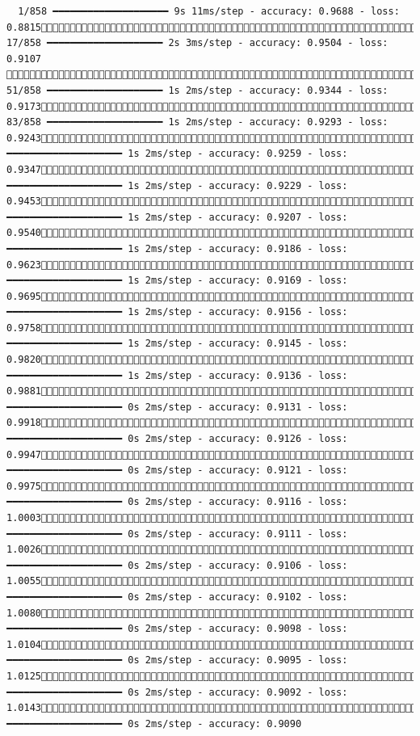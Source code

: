 \documentclass[
  letterpaper,
  DIV=11,
  numbers=noendperiod]{scrartcl}
\begin{document}
\begin{verbatim}
  1/858 ━━━━━━━━━━━━━━━━━━━━ 9s 11ms/step - accuracy: 0.9688 - loss: 0.8815 17/858 ━━━━━━━━━━━━━━━━━━━━ 2s 3ms/step - accuracy: 0.9504 - loss: 0.9107  51/858 ━━━━━━━━━━━━━━━━━━━━ 1s 2ms/step - accuracy: 0.9344 - loss: 0.9173 83/858 ━━━━━━━━━━━━━━━━━━━━ 1s 2ms/step - accuracy: 0.9293 - loss: 0.9243102/858 ━━━━━━━━━━━━━━━━━━━━ 1s 2ms/step - accuracy: 0.9259 - loss: 0.9347122/858 ━━━━━━━━━━━━━━━━━━━━ 1s 2ms/step - accuracy: 0.9229 - loss: 0.9453147/858 ━━━━━━━━━━━━━━━━━━━━ 1s 2ms/step - accuracy: 0.9207 - loss: 0.9540178/858 ━━━━━━━━━━━━━━━━━━━━ 1s 2ms/step - accuracy: 0.9186 - loss: 0.9623210/858 ━━━━━━━━━━━━━━━━━━━━ 1s 2ms/step - accuracy: 0.9169 - loss: 0.9695241/858 ━━━━━━━━━━━━━━━━━━━━ 1s 2ms/step - accuracy: 0.9156 - loss: 0.9758270/858 ━━━━━━━━━━━━━━━━━━━━ 1s 2ms/step - accuracy: 0.9145 - loss: 0.9820305/858 ━━━━━━━━━━━━━━━━━━━━ 1s 2ms/step - accuracy: 0.9136 - loss: 0.9881339/858 ━━━━━━━━━━━━━━━━━━━━ 0s 2ms/step - accuracy: 0.9131 - loss: 0.9918375/858 ━━━━━━━━━━━━━━━━━━━━ 0s 2ms/step - accuracy: 0.9126 - loss: 0.9947412/858 ━━━━━━━━━━━━━━━━━━━━ 0s 2ms/step - accuracy: 0.9121 - loss: 0.9975448/858 ━━━━━━━━━━━━━━━━━━━━ 0s 2ms/step - accuracy: 0.9116 - loss: 1.0003477/858 ━━━━━━━━━━━━━━━━━━━━ 0s 2ms/step - accuracy: 0.9111 - loss: 1.0026513/858 ━━━━━━━━━━━━━━━━━━━━ 0s 2ms/step - accuracy: 0.9106 - loss: 1.0055550/858 ━━━━━━━━━━━━━━━━━━━━ 0s 2ms/step - accuracy: 0.9102 - loss: 1.0080588/858 ━━━━━━━━━━━━━━━━━━━━ 0s 2ms/step - accuracy: 0.9098 - loss: 1.0104624/858 ━━━━━━━━━━━━━━━━━━━━ 0s 2ms/step - accuracy: 0.9095 - loss: 1.0125659/858 ━━━━━━━━━━━━━━━━━━━━ 0s 2ms/step - accuracy: 0.9092 - loss: 1.0143690/858 ━━━━━━━━━━━━━━━━━━━━ 0s 2ms/step - accuracy: 0.9090 
\end{verbatim}
\end{document}
